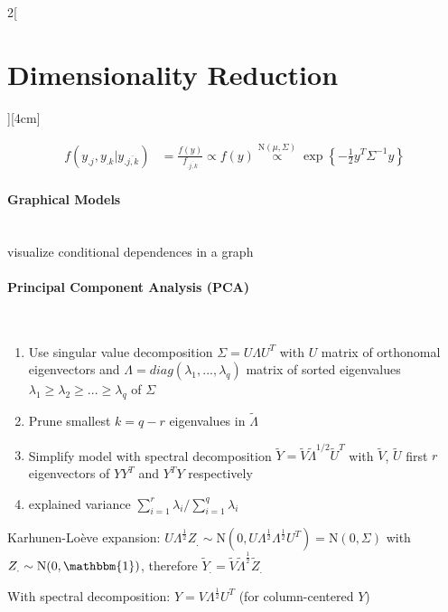 \documentclass[8pt]{extarticle}
\begin{document}
\begin{multicols}{2}[\section{Dimensionality Reduction}][4cm]
\begin{Proof}
\vspace{-1.5em}
\begin{align*}
f(y_{.j}, y_{.k}|y_{.\overline{j,k}}) &= \frac{f(y)}{f_{.\overline{j,k}}} \propto f(y)
\overset{\mathrm{N}(\mu,\Sigma)}{\propto} \exp\left\{-\frac{1}{2}y^T\Sigma^{-1}y\right\}
\end{align*}
\end{Proof}

\paragraph{Graphical Models} \ \\ 
\noindent visualize conditional dependences in a graph

\paragraph{Principal Component Analysis (PCA)} \ \\
\begin{enumerate}
\item Use singular value decomposition $\Sigma = U \Lambda U^T$
with $U$ matrix of orthonomal eigenvectors and $\Lambda = diag(\lambda_1,...,\lambda_q)$ matrix of sorted eigenvalues $\lambda_1 \geq \lambda_2 \geq ... \geq \lambda_q$ of $\Sigma$
\item Prune smallest $k=q-r$ eigenvalues in $\tilde{\Lambda}$
\item Simplify model with spectral decomposition $\tilde{Y} = \tilde{V}\tilde{\Lambda}^{1/2}\tilde{U}^T$ with $\tilde{V}$, $\tilde{U}$ first $r$ eigenvectors of $YY^T$ and $Y^TY$ respectively
\item explained variance $\sum_{i=1}^{r}\lambda_i/\sum_{i=1}^{q}\lambda_i$
\end{enumerate}

\begin{Proof}
Karhunen-Lo\`{e}ve expansion: $U\Lambda^{\frac{1}{2}}Z_{.} \sim \mathrm{N}(0, U\Lambda^{\frac{1}{2}}\Lambda^{\frac{1}{2}}U^T) = \mathrm{N}(0,\Sigma)$ with $Z_{.} \sim \mathrm{N}(0,\mathbbm{1})$, therefore $\tilde{Y}_{.} = \tilde{V}\tilde{\Lambda}^{\frac{1}{2}}\tilde{Z}_{.}$

\noindent With spectral decomposition: $Y=V\Lambda^{\frac{1}{2}}U^T$ (for column-centered $Y$)

\end{Proof}

\end{multicols}
\end{document}

